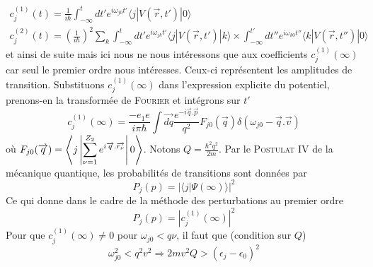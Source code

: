 \begin{eqnarray}
c_j^{(1)}(t)=\frac{1}{i\hbar}\int_{-\infty}^{t}dt'e^{i\omega_{j0}t'}\langle j|V(\overrightarrow{r},t')|0\rangle\\
c_j^{(2)}(t)= \left(\frac{1}{i\hbar}\right)^2\sum_k\int_{-\infty}^{t}dt'e^{i\omega_{jk}t'}\langle j|V(\overrightarrow{r},t')|k\rangle
\times \int_{-\infty}^{t'}dt''e^{i\omega_{k0}t''}\langle k|V(\overrightarrow{r},t'')|0\rangle
\end{eqnarray}
et ainsi de suite mais ici nous ne nous intéressons que aux coefficients $c_j^{(1)}(\infty)$ car
seul le premier ordre nous intéresses. Ceux-ci représentent les amplitudes de transition. 
Substituons $c_j^{(1)}(\infty)$ dans l'expression explicite du potentiel, prenons-en la 
transformée de \textsc{Fourier} et intégrons sur $t'$
\begin{equation}
c_j^{(1)}(\infty)=\frac{-e_1e}{i\pi\hbar}\int \overrightarrow{dq}\frac{e^{-i\overrightarrow{q}.\overrightarrow{p}}}{q^2}F_{j0}(\overrightarrow{q})\delta(\omega_{j0}-\overrightarrow{q}.\overrightarrow{v})
\end{equation}
où $\displaystyle F_{j0}(\overrightarrow{q})=\left\langle j\left| \sum_{\nu=1}^{Z_2}e^{i\overrightarrow{q}.\overrightarrow{r_\nu}}\right| 0\right\rangle$. Notons $Q=\frac{\hbar^2q^2}{2m}$. Par le 
\textsc{Postulat IV} de la mécanique quantique, les probabilités de transitions sont données 
par
\begin{equation}
P_j(p)=\left| \langle j| \Psi(\infty)\rangle\right|^2
\end{equation}
Ce qui donne dans le cadre de la méthode des perturbations au premier ordre
\begin{equation}
P_j(p)=\left| c_j^{(1)}(\infty)\right|^2
\end{equation}
Pour que $c_j^{(1)}(\infty) \neq 0$ pour $\omega_{j0} < q\nu$, il faut que (condition sur $Q$)
\begin{equation}
\omega_{j0}^2<q^2v^2 \Rightarrow 2mv^2Q>(\epsilon_j-\epsilon_0)^2
\end{equation}

